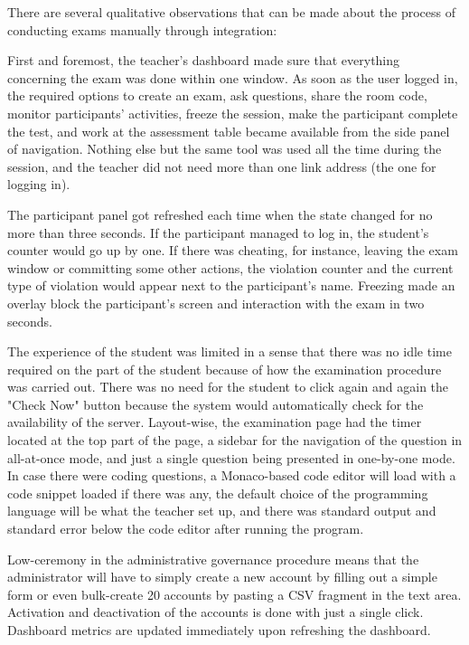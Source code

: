 \documentclass[12pt, a4paper]{report}
\begin{document}
\begin{justify}
  {\fontsize{12}{18}\selectfont
    There are several qualitative observations that can be made about the process of conducting exams manually through integration:

    First and foremost, the teacher's dashboard made sure that everything concerning the exam was done within one window. As soon as the user logged in, the required options to create an exam, ask questions, share the room code, monitor participants' activities, freeze the session, make the participant complete the test, and work at the assessment table became available from the side panel of navigation. Nothing else but the same tool was used all the time during the session, and the teacher did not need more than one link address (the one for logging in).

    The participant panel got refreshed each time when the state changed for no more than three seconds. If the participant managed to log in, the student's counter would go up by one. If there was cheating, for instance, leaving the exam window or committing some other actions, the violation counter and the current type of violation would appear next to the participant's name. Freezing made an overlay block the participant's screen and interaction with the exam in two seconds.

    The experience of the student was limited in a sense that there was no idle time required on the part of the student because of how the examination procedure was carried out. There was no need for the student to click again and again the "Check Now" button because the system would automatically check for the availability of the server. Layout-wise, the examination page had the timer located at the top part of the page, a sidebar for the navigation of the question in all-at-once mode, and just a single question being presented in one-by-one mode. In case there were coding questions, a Monaco-based code editor will load with a code snippet loaded if there was any, the default choice of the programming language will be what the teacher set up, and there was standard output and standard error below the code editor after running the program.

    Low-ceremony in the administrative governance procedure means that the administrator will have to simply create a new account by filling out a simple form or even bulk-create 20 accounts by pasting a CSV fragment in the text area. Activation and deactivation of the accounts is done with just a single click. Dashboard metrics are updated immediately upon refreshing the dashboard.

}
\end{justify}
\end{document}

